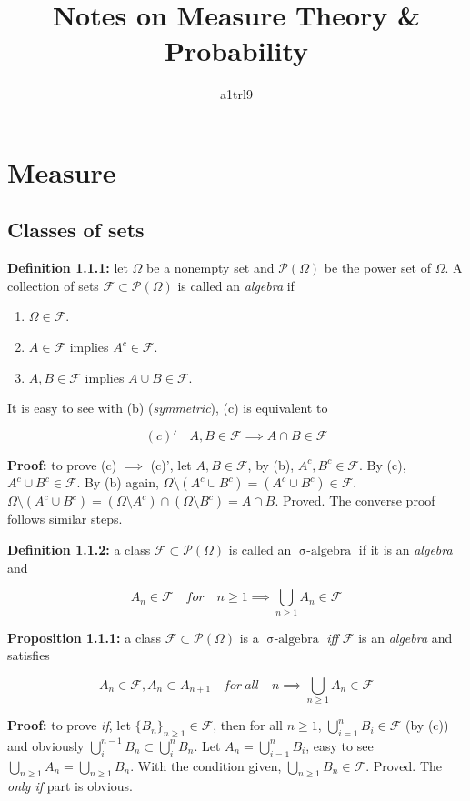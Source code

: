 \documentclass{article}
\title{Notes on Measure Theory \& Probability}
\author{a1trl9}
\date{}
\newcommand{\mc}{\mathcal}
\DeclareMathOperator{\sialge}{\sigma-algebra}
\begin{document}
\maketitle

\section{Measure}
\subsection{Classes of sets}
\textbf{Definition 1.1.1:} let \(\Omega\) be a nonempty set and \(\mc{P}(\Omega)\) be the power set of \(\Omega\).
A collection of sets \(\mc{F}\subset \mc{P}(\Omega)\) is called an \textit{algebra} if

\begin{enumerate}[label=(\alph*)]
\item \(\Omega \in \mc{F}\).
\item \(A \in \mc{F}\) implies \(A^c \in \mc{F}\).
\item \(A, B \in \mc{F}\) implies \(A \cup B \in \mc{F}\).
\end{enumerate}

It is easy to see with (b) (\textit{symmetric}), (c) is equivalent to

\[(c)' \quad A, B \in \mc{F} \implies A \cap B \in \mc{F} \]

\textbf{Proof:} to prove (c) \(\implies\) (c)', let \(A, B \in \mc{F}\), by (b), \(A^c, B^c \in \mc{F}\). By (c), \(
A^c \cup B^c \in \mc{F}\). By (b) again, \(\Omega \setminus (A^c \cup B^c) = (A^c \cup B^c)
\in \mc{F}\). \(\Omega \setminus (A^c \cup B^c) = (\Omega \setminus A^c) \cap (\Omega
\setminus B^c) = A \cap B\). Proved. The converse proof follows similar steps.

\vspace{2mm}
\textbf{Definition 1.1.2: } a class \(\mc{F} \subset \mc{P}(\Omega)\) is called an \textit{\(\sialge\)} if 
it is an \textit{algebra} and

\[A_n \in \mc{F} \quad for \quad n \geq 1 \implies \bigcup_{n\geq 1}A_n \in \mc{F}\]

\textbf{Proposition 1.1.1: } a class \(\mc{F} \subset \mc{P}(\Omega)\) is a \(\sialge\) \textit{iff} 
\(\mc{F}\) is 
an \textit{algebra} and satisfies

\[A_n \in \mc{F}, A_n \subset A_{n+1} \quad for \: all \quad n \implies \bigcup_{n \geq 1}A_n \in \mc{F} \]

\textbf{Proof:} to prove \textit{if}, let \(\{B_n\}_{n\geq 1} \in \mc{F}\), then for all \(n\geq 1\),
\(\bigcup_{i=1}^nB_i \in \mc{F}\) (by (c)) and obviously \(\bigcup_{i}^{n-1}B_n \subset \bigcup_{i}^{n}B_n\).
Let \(A_n=\bigcup_{i=1}^nB_i\), easy to see \(\bigcup_{n\geq 1}A_n=\bigcup_{n\geq 1}B_n\). With the condition given, 
\(\bigcup_{n\geq 1}B_n \in \mc{F}\). Proved. The \textit{only if} part is obvious.
\end{document}
